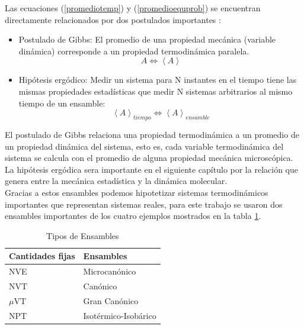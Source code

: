 Las ecuaciones (\ref{promediotemp}) y (\ref{promedioequprob}) se encuentran directamente relacionados por dos postulados importantes \cite{mcquarrie1976}:

\begin{itemize}
    \item Postulado de Gibbs: El promedio de una propiedad mecánica (variable dinámica) corresponde a un propiedad termodinámica paralela.\\
    
    \begin{equation} \label{gibbspostulate}
        A \Longleftrightarrow \left \langle A \right \rangle
    \end{equation}
    
    \item Hipótesis ergódico: Medir un sistema para N instantes en el tiempo tiene las mismas propiedades estadísticas que medir N sistemas arbitrarios al mismo tiempo de un ensamble:
    \begin{equation} \label{ergodichip}
        \left \langle A \right \rangle_{tiempo} \Longleftrightarrow \left \langle A \right \rangle_{ensamble}
    \end{equation}
\end{itemize}

El postulado de Gibbs relaciona una propiedad termodinámica a un promedio de un propiedad dinámica del sistema, esto es, cada variable termodinámica del sistema se calcula con el promedio de alguna propiedad mecánica microscópica. La hipótesis ergódica sera importante en el siguiente capítulo por la relación que genera entre la mecánica estadística y la dinámica molecular.\\

Gracias a estos ensambles podemos hipotetizar sistemas termodinámicos importantes que representan sistemas reales, para este trabajo se usaron dos ensambles importantes de los cuatro ejemplos mostrados en la tabla \ref{tiposEnsamble}.

\begin{table}[h!]
    \centering
    \begin{tabular}{ |p{2cm}||p{4cm}|  }
    \hline
    Cantidades fijas   & Ensambles \\
    \hline
    NVE   & Microcanónico \\
    NVT   & Canónico \\
    $\mu$VT& Gran Canónico \\
    NPT   & Isotérmico-Isobárico \\
    \hline
    \end{tabular}
    \caption{Tipos de Ensambles}
    \label{tiposEnsamble}
\end{table}

